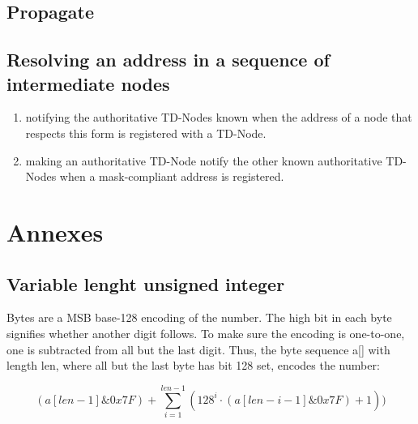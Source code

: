\documentclass[12pt,oneside]{wlscirep}
\begin{document}
\subsection{Propagate}
\label{ssec:propagation}

\subsection{Resolving an address in a sequence of intermediate nodes}
\label{ssec:resolving}

\begin{enumerate}

\item notifying the authoritative TD-Nodes known when the address of a node that respects this form is registered with a TD-Node.
\item making an authoritative TD-Node notify the other known authoritative TD-Nodes when a mask-compliant address is registered.
\end{enumerate}












\clearpage
\appendix
\section{Annexes}
\subsection{Variable lenght unsigned integer}
\label{annex:varint}
Bytes are a MSB base-128 encoding of the number. The high bit in each byte signifies whether another digit follows. To make sure the encoding is one-to-one, one is subtracted from all but the last digit. Thus, the byte sequence a[] with length len, where all but the last byte has bit 128 set, encodes the number:\par

\begin{equation} \label{eq:5}
(a[len-1] \& 0x7F) + \sum_{i=1}^{len-1}(128^i \cdot (a[len-i-1] \& 0x7F)+1))
\end{equation}\par
\end{document}
